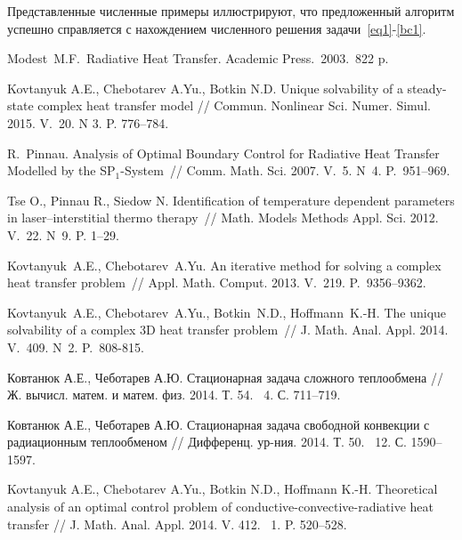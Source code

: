 \documentclass[12pt]{article}
\begin{document}
    Представленные численные примеры иллюстрируют, что предложенный алгоритм успешно справляется
    с нахождением численного решения задачи~\eqref{eq1}-\eqref{bc1}.



    \begin{thebibliography}{999}

        Modest~M.F.\ Radiative Heat Transfer.
        Academic Press.\ 2003.\ 822 p.

        Kovtanyuk A.E., Chebotarev A.Yu., Botkin N.D.
        Unique solvability of a steady-state complex heat transfer model
        // Commun. Nonlinear Sci. Numer. Simul. 2015. V.~20. N 3. P. 776--784.

        R.~Pinnau. Analysis of Optimal Boundary Control for Radiative Heat
        Transfer Modelled by the SP$_1$-System~// Comm.
        Math. Sci. 2007. V.~5. N~4. P.~951--969.

        Tse O., Pinnau R., Siedow N. Identification of temperature
        dependent parameters in laser--interstitial thermo therapy~//
        Math. Models Methods Appl. Sci. 2012. V.~22. N~9. P. 1--29.

        Kovtanyuk~A.E., Chebotarev~A.Yu. An iterative method for solving a
        complex heat transfer problem~// Appl.
        Math. Comput. 2013. V.~219. P.~9356--9362.

        Kovtanyuk~A.E., Chebotarev~A.Yu., Botkin~N.D., Hoffmann~K.-H. The
        unique solvability of a complex 3D heat transfer problem~// J.
        Math. Anal. Appl. 2014. V.~409. N~2. P.~808-815.

        Ковтанюк А.Е., Чеботарев А.Ю. Стационарная задача сложного теплообмена // Ж.
        вычисл. матем. и матем. физ. 2014. Т. 54. \textnumero~4. С. 711--719.

        Ковтанюк А.Е., Чеботарев А.Ю. Стационарная задача свободной конвекции с радиационным теплообменом // Дифференц.
        ур-ния. 2014. Т. 50. \textnumero~12. С. 1590--1597.

        Kovtanyuk A.E., Chebotarev A.Yu., Botkin N.D., Hoffmann K.-H. Theoretical analysis of an optimal
        control problem of conductive-convective-radiative heat transfer // J. Math.
        Anal. Appl. 2014. V. 412. \textnumero~1. P. 520--528.


\end{thebibliography}
\end{document}
